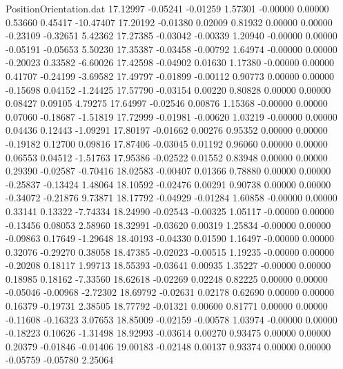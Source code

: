 \begin{filecontents}{PositionOrientation.dat}
  17.12997   -0.05241   -0.01259     1.57301   -0.00000    0.00000    0.53660    0.45417  -10.47407
  17.20192   -0.01380    0.02009     0.81932    0.00000    0.00000   -0.23109   -0.32651    5.42362
  17.27385   -0.03042   -0.00339     1.20940   -0.00000    0.00000   -0.05191   -0.05653    5.50230
  17.35387   -0.03458   -0.00792     1.64974   -0.00000    0.00000   -0.20023    0.33582   -6.60026
  17.42598   -0.04902    0.01630     1.17380   -0.00000    0.00000    0.41707   -0.24199   -3.69582
  17.49797   -0.01899   -0.00112     0.90773    0.00000    0.00000   -0.15698    0.04152   -1.24425
  17.57790   -0.03154    0.00220     0.80828    0.00000    0.00000    0.08427    0.09105    4.79275
  17.64997   -0.02546    0.00876     1.15368   -0.00000    0.00000    0.07060   -0.18687   -1.51819
  17.72999   -0.01981   -0.00620     1.03219   -0.00000    0.00000    0.04436    0.12443   -1.09291
  17.80197   -0.01662    0.00276     0.95352    0.00000    0.00000   -0.19182    0.12700    0.09816
  17.87406   -0.03045    0.01192     0.96060    0.00000    0.00000    0.06553    0.04512   -1.51763
  17.95386   -0.02522    0.01552     0.83948    0.00000    0.00000    0.29390   -0.02587   -0.70416
  18.02583   -0.00407    0.01366     0.78880    0.00000    0.00000   -0.25837   -0.13424    1.48064
  18.10592   -0.02476    0.00291     0.90738    0.00000    0.00000   -0.34072   -0.21876    9.73871
  18.17792   -0.04929   -0.01284     1.60858   -0.00000    0.00000    0.33141    0.13322   -7.74334
  18.24990   -0.02543   -0.00325     1.05117   -0.00000    0.00000   -0.13456    0.08053    2.58960
  18.32991   -0.03620    0.00319     1.25834   -0.00000    0.00000   -0.09863    0.17649   -1.29648
  18.40193   -0.04330    0.01590     1.16497   -0.00000    0.00000    0.32076   -0.29270    0.38058
  18.47385   -0.02023   -0.00515     1.19235   -0.00000    0.00000   -0.20208    0.18117    1.99713
  18.55393   -0.03641    0.00935     1.35227   -0.00000    0.00000    0.18985    0.18162   -7.33560
  18.62618   -0.02269    0.02248     0.82225    0.00000    0.00000   -0.05046   -0.00968   -2.72302
  18.69792   -0.02631    0.02178     0.62690    0.00000    0.00000    0.16379   -0.19731    2.38505
  18.77792   -0.01321    0.00600     0.81771    0.00000    0.00000   -0.11608   -0.16323    3.07653
  18.85009   -0.02159   -0.00578     1.03974   -0.00000    0.00000   -0.18223    0.10626   -1.31498
  18.92993   -0.03614    0.00270     0.93475    0.00000    0.00000    0.20379   -0.01846   -0.01406
  19.00183   -0.02148    0.00137     0.93374    0.00000    0.00000   -0.05759   -0.05780    2.25064

\end{filecontents}
